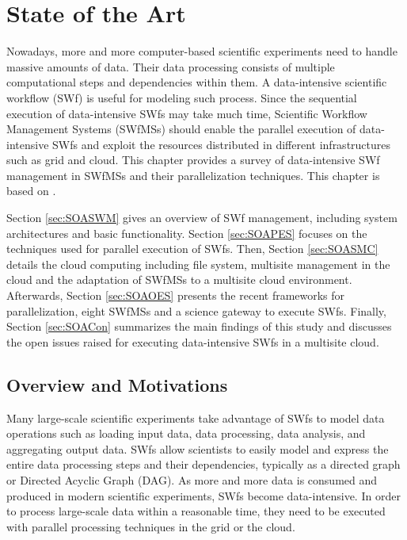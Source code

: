 \chapter{State of the Art} \label{State}

Nowadays, more and more computer-based scientific experiments need
to handle massive amounts of data. Their data processing
consists of multiple computational steps and dependencies within them.
A data-intensive scientific workflow (SWf) is useful
for modeling such process. Since the sequential execution of
data-intensive SWfs may take much time, 
Scientific Workflow Management Systems (SWfMSs)
should enable the parallel execution of data-intensive SWfs and exploit the resources distributed in different
infrastructures such as grid and cloud. 
This chapter provides a survey of data-intensive SWf management in SWfMSs and their parallelization techniques. This chapter is based on \cite{Liu2015}\cite{Liu2014a}.

Section \ref{sec:SOASWM} gives an overview of SWf management, including system architectures
and basic functionality. Section \ref{sec:SOAPES} focuses on the techniques 
used for parallel execution of SWfs. 
Then, Section \ref{sec:SOASMC} details the cloud computing including file system, multisite management in the cloud and the adaptation of SWfMSs to a multisite cloud environment.
Afterwards, Section \ref{sec:SOAOES} presents the recent frameworks for parallelization, eight SWfMSs and a science gateway to execute SWfs.
Finally, Section \ref{sec:SOACon} summarizes the main findings of this study and discusses the open issues raised for executing data-intensive SWfs in a multisite cloud. 

\section{Overview and Motivations}
\label{sec:SOAIntro}

Many large-scale scientific experiments take advantage of SWfs to model data operations such as loading input data, data
processing, data analysis, and aggregating output data. SWfs allow scientists to easily model and express the entire
data processing steps and their dependencies, typically as a directed
graph or Directed Acyclic Graph (DAG). As more and more data is consumed and produced in modern scientific experiments, SWfs become data-intensive. In order to process large-scale data within a reasonable time, they need to be executed with parallel processing techniques in the grid or the cloud. 

